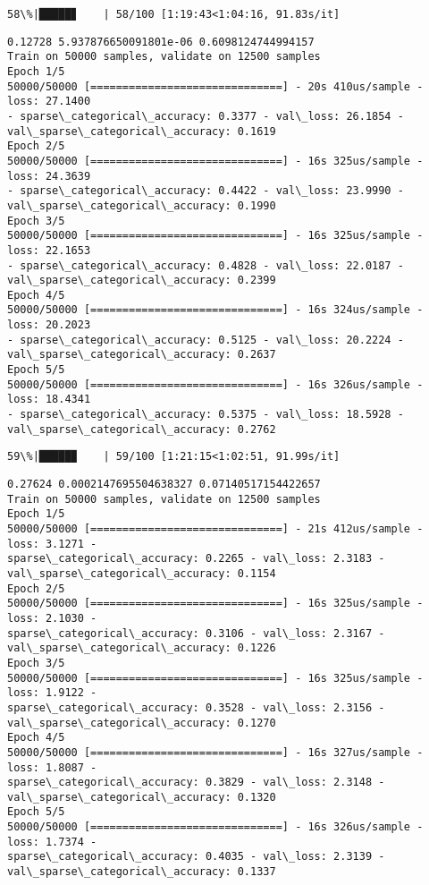 \documentclass[11pt]{article}
\begin{document}
    \begin{Verbatim}[commandchars=\\\{\}]
 58\%|█████▊    | 58/100 [1:19:43<1:04:16, 91.83s/it]
    \end{Verbatim}

    \begin{Verbatim}[commandchars=\\\{\}]
0.12728 5.937876650091801e-06 0.6098124744994157
Train on 50000 samples, validate on 12500 samples
Epoch 1/5
50000/50000 [==============================] - 20s 410us/sample - loss: 27.1400
- sparse\_categorical\_accuracy: 0.3377 - val\_loss: 26.1854 -
val\_sparse\_categorical\_accuracy: 0.1619
Epoch 2/5
50000/50000 [==============================] - 16s 325us/sample - loss: 24.3639
- sparse\_categorical\_accuracy: 0.4422 - val\_loss: 23.9990 -
val\_sparse\_categorical\_accuracy: 0.1990
Epoch 3/5
50000/50000 [==============================] - 16s 325us/sample - loss: 22.1653
- sparse\_categorical\_accuracy: 0.4828 - val\_loss: 22.0187 -
val\_sparse\_categorical\_accuracy: 0.2399
Epoch 4/5
50000/50000 [==============================] - 16s 324us/sample - loss: 20.2023
- sparse\_categorical\_accuracy: 0.5125 - val\_loss: 20.2224 -
val\_sparse\_categorical\_accuracy: 0.2637
Epoch 5/5
50000/50000 [==============================] - 16s 326us/sample - loss: 18.4341
- sparse\_categorical\_accuracy: 0.5375 - val\_loss: 18.5928 -
val\_sparse\_categorical\_accuracy: 0.2762
    \end{Verbatim}

    \begin{Verbatim}[commandchars=\\\{\}]
 59\%|█████▉    | 59/100 [1:21:15<1:02:51, 91.99s/it]
    \end{Verbatim}

    \begin{Verbatim}[commandchars=\\\{\}]
0.27624 0.0002147695504638327 0.07140517154422657
Train on 50000 samples, validate on 12500 samples
Epoch 1/5
50000/50000 [==============================] - 21s 412us/sample - loss: 3.1271 -
sparse\_categorical\_accuracy: 0.2265 - val\_loss: 2.3183 -
val\_sparse\_categorical\_accuracy: 0.1154
Epoch 2/5
50000/50000 [==============================] - 16s 325us/sample - loss: 2.1030 -
sparse\_categorical\_accuracy: 0.3106 - val\_loss: 2.3167 -
val\_sparse\_categorical\_accuracy: 0.1226
Epoch 3/5
50000/50000 [==============================] - 16s 325us/sample - loss: 1.9122 -
sparse\_categorical\_accuracy: 0.3528 - val\_loss: 2.3156 -
val\_sparse\_categorical\_accuracy: 0.1270
Epoch 4/5
50000/50000 [==============================] - 16s 327us/sample - loss: 1.8087 -
sparse\_categorical\_accuracy: 0.3829 - val\_loss: 2.3148 -
val\_sparse\_categorical\_accuracy: 0.1320
Epoch 5/5
50000/50000 [==============================] - 16s 326us/sample - loss: 1.7374 -
sparse\_categorical\_accuracy: 0.4035 - val\_loss: 2.3139 -
val\_sparse\_categorical\_accuracy: 0.1337
    \end{Verbatim}
\end{document}
